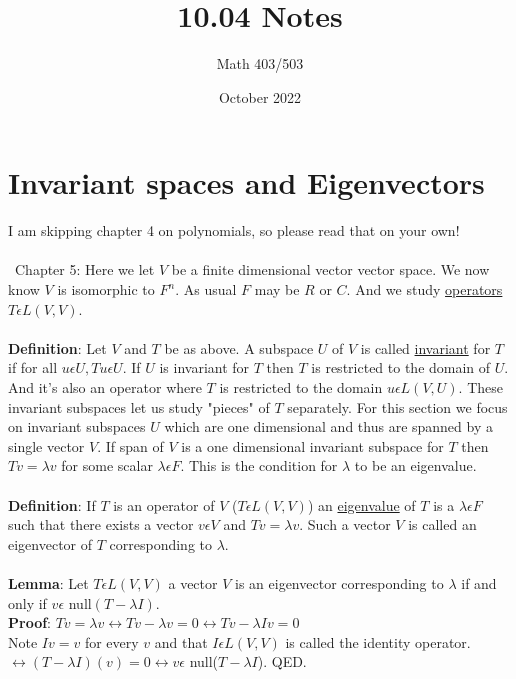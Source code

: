 \documentclass{article}
\title{10.04 Notes}
\author{Math 403/503 }
\date{October 2022}
\begin{document}
\maketitle

\section{Invariant spaces and Eigenvectors}

I am skipping chapter 4 on polynomials, so please read that on your own!\\\\\
Chapter 5: Here we let $V$ be a finite dimensional vector vector space. We now know $V$ is isomorphic to $F^n$. As usual $F$ may be $R$ or $C$. And we study \underline{operators} $T \epsilon L(V,V)$. \\\\
\textbf{Definition}: Let $V$ and $T$ be as above. A subspace $U$ of $V$ is called \underline{invariant} for $T$ if for all $u \epsilon U, Tu \epsilon U$. If $U$ is invariant for $T$ then $T$ is restricted to the domain of $U$. And it's also an operator where $T$ is restricted to the domain $u \epsilon L(V,U)$. These invariant subspaces let us study "pieces" of $T$ separately. For this section we focus on invariant subspaces $U$ which are one dimensional and thus are spanned by a single vector $V$. If span of $V$ is a one dimensional invariant subspace for $T$ then $Tv = \lambda v$ for some scalar $\lambda \epsilon F$. This is the condition for $\lambda$ to be an eigenvalue.\\\\
\textbf{Definition}: If $T$ is an operator of $V$ ($T \epsilon L(V,V)$) an \underline{eigenvalue} of $T$ is a $\lambda \epsilon F$ such that there exists a vector $v \epsilon V$ and $Tv = \lambda v$. Such a vector $V$ is called an eigenvector of $T$ corresponding to $\lambda$. \\\\
\textbf{Lemma}: Let $T \epsilon L(V,V)$ a vector $V$ is an eigenvector corresponding to $\lambda$ if and only if $v \epsilon$ null$(T - \lambda I)$. \\
\textbf{Proof}: $Tv = \lambda v \leftrightarrow Tv - \lambda v = 0 \leftrightarrow Tv - \lambda Iv = 0$ \\ Note $Iv = v$ for every $v$ and that $I \epsilon L(V,V)$ is called the identity operator. \\
$\leftrightarrow (T - \lambda I)(v) = 0 \leftrightarrow v \epsilon$ null($T - \lambda I$). QED. \\\\
\end{document}
